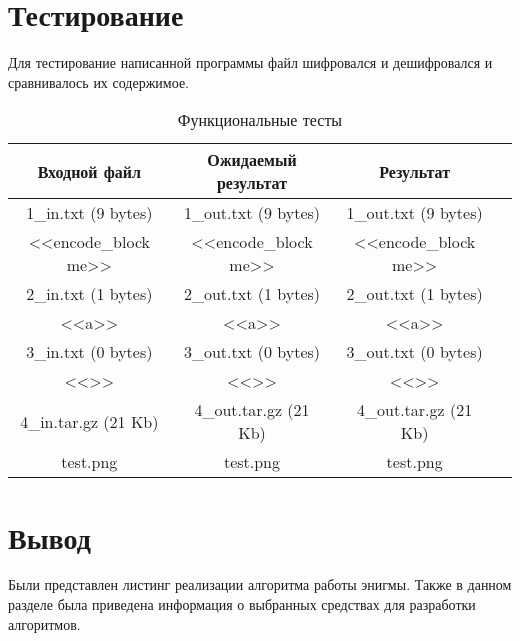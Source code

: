 \section{Тестирование}

Для тестирование написанной программы файл шифровался и дешифровался и сравнивалось их содержимое.

\begin{table}[h]
	\begin{center}
		\begin{threeparttable}
			\captionsetup{justification=raggedright,singlelinecheck=off}
			\caption{\label{tbl:functional_} Функциональные тесты}
			\begin{tabular}{|c|c|c|c|}
				\hline
				Входной файл & Ожидаемый результат & Результат \\ 
				\hline
				1\_in.txt (9 bytes) & 1\_out.txt (9 bytes) & 1\_out.txt (9 bytes)\\
				<<encode\_block me>> & <<encode\_block me>> &<<encode\_block me>>\\
				\hline
				2\_in.txt (1 bytes) & 2\_out.txt (1 bytes) & 2\_out.txt (1 bytes)\\
				<<a>> & <<a>> &<<a>>\\
				\hline
				3\_in.txt (0 bytes) & 3\_out.txt (0 bytes) & 3\_out.txt (0 bytes)\\
				<<>> & <<>> &<<>>\\
				\hline
				4\_in.tar.gz (21 Kb) & 4\_out.tar.gz (21 Kb) & 4\_out.tar.gz (21 Kb)\\
				test.png & test.png & test.png\\
				\hline
			\end{tabular}
		\end{threeparttable}
	\end{center}
\end{table}
\FloatBarrier

\section*{Вывод}

Были представлен листинг реализации алгоритма работы энигмы. Также в данном разделе была приведена информация о выбранных средствах для разработки алгоритмов.
